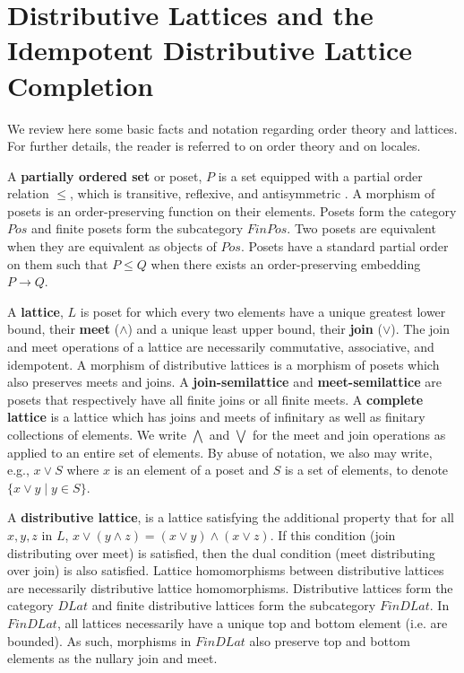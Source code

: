 \documentclass[a4paper,USenglish,cleveref, autoref, thm-restate,authorcolumns]{lipics-v2019}
\begin{document}
\section{Distributive Lattices and the Idempotent Distributive Lattice Completion}

We review here some basic facts and notation regarding order theory and lattices. For further details, the reader is referred to \cite{davey2002introduction} on order theory and \cite{johnstone1982stone} on locales.

A \textbf{partially ordered set} or poset, \(P\) is a set equipped with a partial order relation \(\le\), which is transitive, reflexive, and antisymmetric . A morphism of posets is an order-preserving function on their elements. Posets form the category \(Pos\) and finite posets form the subcategory \(FinPos\). Two posets are equivalent when they are equivalent as objects of \(Pos\). Posets have a standard partial order on them such that \(P \le Q\) when there exists an order-preserving embedding \(P \rightarrow Q\).

A \textbf{lattice}, \(L\) is poset for which every two elements have a unique greatest lower bound, their \textbf{meet} (\(\wedge\)) and a unique least upper bound, their \textbf{join} (\(\vee\)). The join and meet operations of a lattice are necessarily commutative, associative, and idempotent. A morphism of distributive lattices is a morphism of posets which also preserves meets and joins. A \textbf{join-semilattice} and \textbf{meet-semilattice} are posets that respectively have all finite joins or all finite meets. A \textbf{complete lattice} is a lattice which has joins and meets of infinitary as well as finitary collections of elements. We write \(\bigwedge\) and \(\bigvee\) for the meet and join operations as applied to an entire set of elements. By abuse of notation, we also may write, e.g., \(x \vee S\) where \(x\) is an element of a poset and \(S\) is a set of elements, to denote \(\{ x \vee y \mathbin{|} y \in S\}\). 

A \textbf{distributive lattice}, is a lattice satisfying the additional property that for all \(x, y, z\) in \(L\), \(x \vee (y \wedge z) = (x \vee y) \wedge (x \vee z)\). If this condition (join distributing over meet) is satisfied, then the dual condition (meet distributing over join) is also satisfied.  Lattice homomorphisms between distributive lattices are necessarily distributive lattice homomorphisms. Distributive lattices form the category \(DLat\) and finite distributive lattices form the subcategory \(FinDLat\). In \(FinDLat\), all lattices necessarily have a unique top and bottom element (i.e. are bounded). As such, morphisms in \(FinDLat\) also preserve top and bottom elements as the nullary join and meet.
\end{document}
